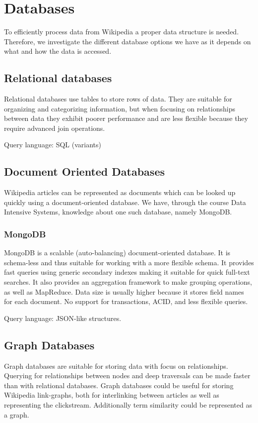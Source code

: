 \section{Databases}
To efficiently process data from Wikipedia a proper data structure is needed. Therefore, we investigate the different database options we have as it depends on what and how the data is accessed.

\subsection{Relational databases}
Relational databases use tables to store rows of data. They are suitable for organizing and categorizing information, but when focusing on relationships between data they exhibit poorer performance and are less flexible because they require advanced join operations.

Query language: SQL (variants)

\subsection{Document Oriented Databases}
Wikipedia articles can be represented as documents which can be looked up quickly using a document-oriented database. We have, through the course Data Intensive Systems, knowledge about one such database, namely MongoDB\@.

\subsubsection{MongoDB}
MongoDB is a scalable (auto-balancing) document-oriented database. It is schema-less and thus suitable for working with a more flexible schema.
It provides fast queries using generic secondary indexes making it suitable for quick full-text searches. It also provides an aggregation framework to make grouping operations, as well as MapReduce.
Data size is usually higher because it stores field names for each document. No support for transactions, ACID, and less flexible queries. 

Query language: JSON-like structures.

\subsection{Graph Databases}
Graph databases are suitable for storing data with focus on relationships. Querying for relationships between nodes and deep traversals can be made faster than with relational databases.
Graph databases could be useful for storing Wikipedia link-graphs, both for interlinking between articles as well as representing the clickstream. Additionally term similarity could be represented as a graph.

